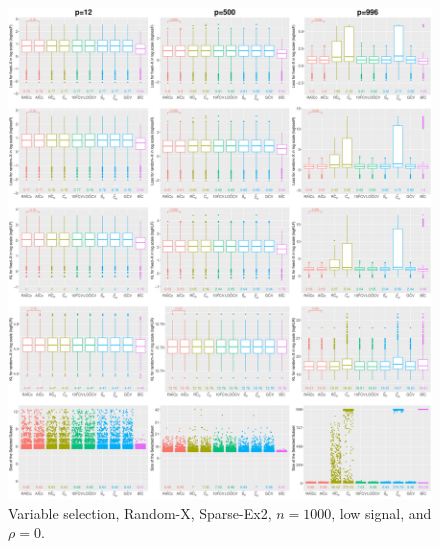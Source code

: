 \begin{figure}[!ht]
\centering
\includegraphics[width=\textwidth]{figures/supplement/randomx/subset_selection/Sparse-Ex2_n1000_lsnr_rho0.eps}
\caption{Variable selection, Random-X, Sparse-Ex2, $n=1000$, low signal, and $\rho=0$.}
\end{figure}
\clearpage
